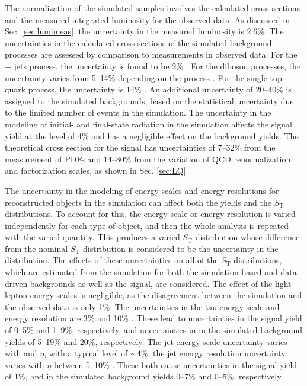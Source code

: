 \documentclass[12pt]{thesis}  %
\def\ST{\ensuremath{S_{\text{T}}}\xspace}
\begin{document}
The normalization of the simulated samples involves the calculated cross sections and the measured integrated luminosity for the observed data. As discussed in Sec. \ref{sec:lumimeas}, the uncertainty in the measured luminosity is 2.6\%. The uncertainties in the calculated cross sections of the simulated background processes are assessed by comparison to measurements in observed data. For the \Z + jets process, the uncertainty is found to be 2\% \cite{PhysRevLett.112.191802}. For the diboson processes, the uncertainty varies from 5--14\% depending on the process \cite{WZxsec}. For the single top quark process, the uncertainty is 14\% \cite{CMS-PAS-TOP-2012-002}. An additional uncertainty of 20--40\% is assigned to the simulated backgrounds, based on the statistical uncertainty due to the limited number of events in the simulation. The uncertainty in the modeling of initial- and final-state radiation in the simulation affects the signal yield at the level of 4\% and has a negligible effect on the background yields. The theoretical cross section for the signal has uncertainties of 7--32\% from the measurement of PDFs and 14--80\% from the variation of QCD renormalization and factorization scales, as shown in Sec. \ref{sec:LQ}.

The uncertainty in the modeling of energy scales and energy resolutions for reconstructed objects in the simulation can affect both the yields and the \ST distributions. To account for this, the energy scale or energy resolution is varied independently for each type of object, and then the whole analysis is repeated with the varied quantity. This produces a varied \ST distribution whose difference from the nominal \ST distribution is considered to be the uncertainty in the distribution. The effects of these uncertainties on all of the \ST distributions, which are estimated from the simulation for both the simulation-based and data-driven backgrounds as well as the signal, are considered. The effect of the light lepton energy scales is negligible, as the disagreement between the simulation and the observed data is only 1\%. The uncertainties in the tau energy scale and energy resolution are 3\% and 10\% \cite{TauID}. These lead to uncertainties in the signal yield of 0--5\% and 1--9\%, respectively, and uncertainties in in the simulated background yields of 5--19\% and 20\%, respectively. The jet energy scale uncertainty varies with \pt and $\eta$, with a typical level of ${\sim}4\%$; the jet energy resolution uncertainty varies with $\eta$ between 5--10\% \cite{CMS-JEC,CMS-DP-2013-033}. These both cause uncertainties in the signal yield of 1\%, and in the simulated background yields 0--7\% and 0--5\%, respectively.
\end{document}

